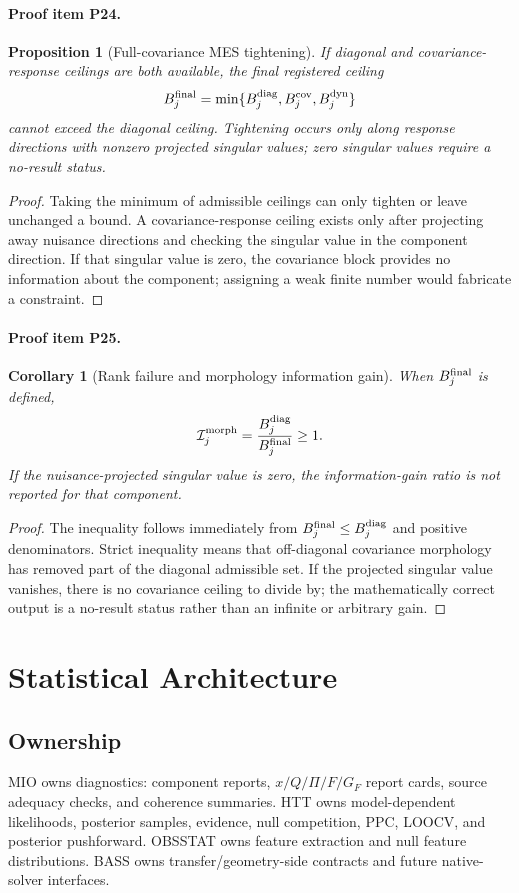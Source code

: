 \documentclass[11pt]{article}
\newcommand{\GF}{G_F}
\newtheorem{proposition}{Proposition}
\newtheorem{corollary}{Corollary}
\begin{document}
\paragraph{Proof item P24.}
\begin{proposition}[Full-covariance MES tightening]
If diagonal and covariance-response ceilings are both available, the final registered ceiling
\[
  B_j^{\rm final}=\min\{B_j^{\rm diag},B_j^{\rm cov},B_j^{\rm dyn}\}
\]
cannot exceed the diagonal ceiling.  Tightening occurs only along response directions with nonzero projected singular values; zero singular values require a no-result status.
\end{proposition}
\begin{proof}
Taking the minimum of admissible ceilings can only tighten or leave unchanged a bound.  A covariance-response ceiling exists only after projecting away nuisance directions and checking the singular value in the component direction.  If that singular value is zero, the covariance block provides no information about the component; assigning a weak finite number would fabricate a constraint.
\end{proof}

\paragraph{Proof item P25.}
\begin{corollary}[Rank failure and morphology information gain]
When \(B_j^{\rm final}\) is defined,
\[
  {\cal I}_j^{\rm morph}=\frac{B_j^{\rm diag}}{B_j^{\rm final}}\ge1.
\]
If the nuisance-projected singular value is zero, the information-gain ratio is not reported for that component.
\end{corollary}
\begin{proof}
The inequality follows immediately from \(B_j^{\rm final}\le B_j^{\rm diag}\) and positive denominators.  Strict inequality means that off-diagonal covariance morphology has removed part of the diagonal admissible set.  If the projected singular value vanishes, there is no covariance ceiling to divide by; the mathematically correct output is a no-result status rather than an infinite or arbitrary gain.
\end{proof}

\section{Statistical Architecture}
\subsection{Ownership}
MIO owns diagnostics: component reports, \(x/Q/\Pi/F/\GF\) report cards, source adequacy checks, and coherence summaries.  HTT owns model-dependent likelihoods, posterior samples, evidence, null competition, PPC, LOOCV, and posterior pushforward.  OBSSTAT owns feature extraction and null feature distributions.  BASS owns transfer/geometry-side contracts and future native-solver interfaces.
\end{document}
